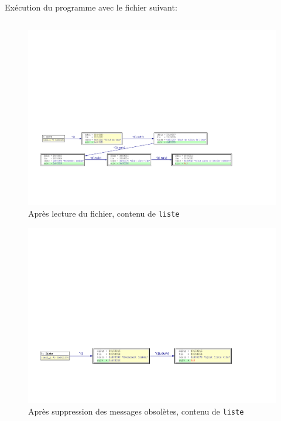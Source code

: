 Exécution du programme avec le fichier suivant:
\inputminted[frame=single,label=Test]{text}{../tests/test_insert}

\begin{figure}[h!]
	\centering
	\includegraphics[width=18cm,clip=true,trim=1cm 4cm 5cm 12cm]{../tests/ddd_graph/chargement}
	\caption{Après lecture du fichier, contenu de \texttt{liste}}
\end{figure}

\begin{figure}[h!]
	\centering
	\includegraphics[width=15cm,clip=true,trim=1cm 4cm 5cm 13cm]{../tests/ddd_graph/nettoyage}
	\caption{Après suppression des messages obsolètes, contenu de \texttt{liste}}
\end{figure}

